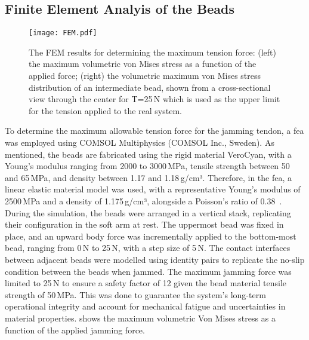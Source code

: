 \subsection{Finite Element Analyis of the Beads}
\begin{figure}
    \centering
    \texttt{[image: FEM.pdf]}
    \caption{The FEM results for determining the maximum tension force: (left) the maximum volumetric von Mises stress as a function of the applied force; (right) the volumetric maximum von Mises stress distribution of an intermediate bead, shown from a cross-sectional view through the center for T=25\,N which is used as the upper limit for the tension applied to the real system. 
    }
    \label{fig:FEM}
\end{figure}
To determine the maximum allowable tension force for the jamming tendon, a \gls{fea} was employed using COMSOL Multiphysics\textsuperscript{\textregistered} (COMSOL Inc., Sweden). As mentioned, the beads are fabricated using the rigid material VeroCyan, with a Young's modulus ranging from 2000 to 3000\,MPa, tensile strength between 50 and 65\,MPa, and density between 1.17 and 1.18\,g/cm³. Therefore, in the \gls{fea}, a linear elastic material model was used, with a representative Young’s modulus of 2500\,MPa and a density of 1.175\,g/cm³, alongside a Poisson’s ratio of 0.38~\cite{vero_poisson_ratio}. During the simulation, the beads were arranged in a vertical stack, replicating their configuration in the soft arm at rest. The uppermost bead was fixed in place, and an upward body force was incrementally applied to the bottom-most bead, ranging from 0\,N to 25\,N, with a step size of 5\,N. The contact interfaces between adjacent beads were modelled using identity pairs to replicate the no-slip condition between the beads when jammed. The maximum jamming force was limited to 25\,N to ensure a safety factor of 12 given the bead material tensile strength of 50\,MPa. This was done to guarantee the system's long-term operational integrity and account for mechanical fatigue and uncertainties in material properties.
%
 shows the maximum volumetric Von Mises stress as a function of the applied jamming force. 









